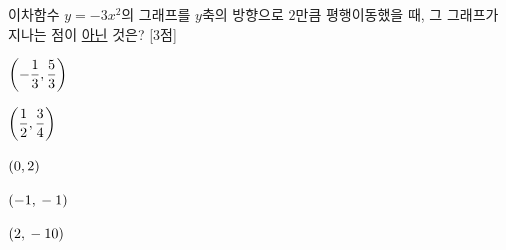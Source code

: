 이차함수 $y=-3x^2$의 그래프를 $y$축의 방향으로 $2$만큼 평행이동했을 때, 그 그래프가 지나는 점이 \underline{아닌} 것은? \mbox{[3점]}
\begin{choices32}{\rule[-3ex]{0pt}{8ex}$\left(-\dfrac{1}{3}{,}\mkern3mu \dfrac{5}{3}\right)$}{\rule[-3ex]{0pt}{8ex}$\left(\dfrac{1}{2}{,}\mkern3mu \dfrac{3}{4}\right)$}{\rule[-3ex]{0pt}{8ex}$(0{,}\mkern3mu 2)$}{\rule[-3ex]{0pt}{8ex}$(-1{,}\mkern3mu -1)$}{\rule[-3ex]{0pt}{8ex}$(2{,}\mkern3mu -10)$}\end{choices32}
